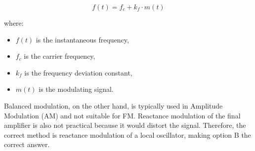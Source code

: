 \[
f(t) = f_c + k_f \cdot m(t)
\]

where:
\begin{itemize}
    \item \( f(t) \) is the instantaneous frequency,
    \item \( f_c \) is the carrier frequency,
    \item \( k_f \) is the frequency deviation constant,
    \item \( m(t) \) is the modulating signal.
\end{itemize}

Balanced modulation, on the other hand, is typically used in Amplitude Modulation (AM) and not suitable for FM. Reactance modulation of the final amplifier is also not practical because it would distort the signal. Therefore, the correct method is reactance modulation of a local oscillator, making option B the correct answer.


